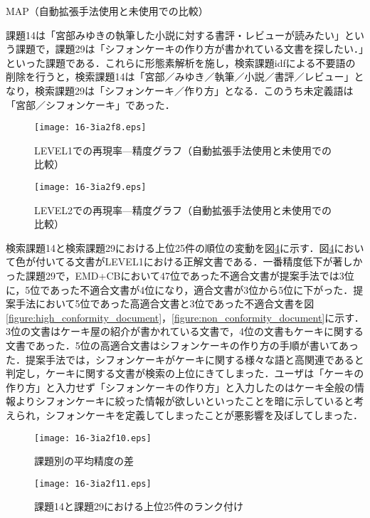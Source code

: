 \documentclass[japanese]{jnlp_1.4}
\begin{document}
\begin{table}[b]
\caption{MAP（自動拡張手法使用と未使用での比較）}
\label{table:MAP(level1)}

\end{table}

課題14は「宮部みゆきの執筆した小説に対する書評・レビューが読みたい」という課題で，課題29は「シフォンケーキの作り方が書かれている文書を探したい．」といった課題である．これらに形態素解析を施し，検索課題idfによる不要語の削除を行うと，検索課題14は「宮部／みゆき／執筆／小説／書評／レビュー」となり，検索課題29は「シフォンケーキ／作り方」となる．このうち未定義語は「宮部／シフォンケーキ」であった．

\begin{figure}[t]
\begin{center}
\texttt{[image: 16-3ia2f8.eps]}
\caption{LEVEL1での再現率—精度グラフ（自動拡張手法使用と未使用での比較）}
\label{figure:RPC(level1)}
\end{center}
\end{figure}
\begin{figure}[t]
\begin{center}
\texttt{[image: 16-3ia2f9.eps]}
\caption{LEVEL2での再現率—精度グラフ（自動拡張手法使用と未使用での比較）}
\label{figure:RPC(level2)}
\end{center}
\end{figure}

検索課題14と検索課題29における上位25件の順位の変動を図\ref{figure:change_of_order}に示す．図\ref{figure:change_of_order}において色が付いてる文書がLEVEL1における正解文書である．一番精度低下が著しかった課題29で，EMD+CBにおいて47位であった不適合文書が提案手法では3位に，5位であった不適合文書が4位になり，適合文書が3位から5位に下がった．提案手法において5位であった高適合文書と3位であった不適合文書を図\ref{figure:high_conformity_document}，\ref{figure:non_conformity_document}に示す．
3位の文書はケーキ屋の紹介が書かれている文書で，4位の文書もケーキに関する文書であった．5位の高適合文書はシフォンケーキの作り方の手順が書いてあった．提案手法では，シフォンケーキがケーキに関する様々な語と高関連であると判定し，ケーキに関する文書が検索の上位にきてしまった．ユーザは「ケーキの作り方」と入力せず「シフォンケーキの作り方」と入力したのはケーキ全般の情報よりシフォンケーキに絞った情報が欲しいといったことを暗に示していると考えられ，シフォンケーキを定義してしまったことが悪影響を及ぼしてしまった．

\begin{figure}[t]
\begin{center}
\texttt{[image: 16-3ia2f10.eps]}
\caption{課題別の平均精度の差}
\label{figure:difference_from_average_precision}
\end{center}
\end{figure}
\begin{figure}[t]
\begin{center}
\texttt{[image: 16-3ia2f11.eps]}
\caption{課題14と課題29における上位25件のランク付け}
\label{figure:change_of_order}
\end{center}
\end{figure}
\end{document}
